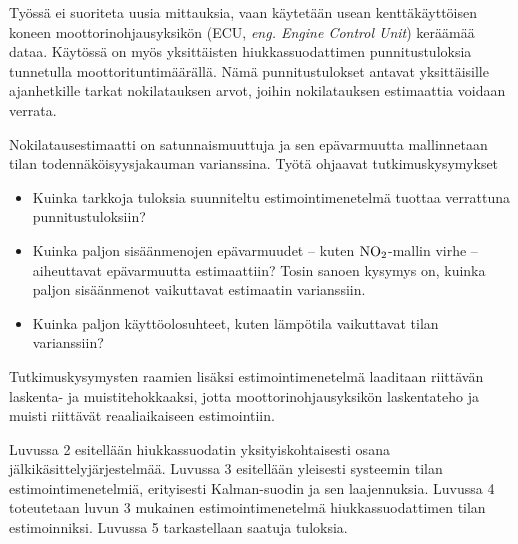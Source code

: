 Työssä ei suoriteta uusia mittauksia, vaan käytetään usean kenttäkäyttöisen koneen moottorinohjausyksikön (ECU, \emph{eng. Engine Control Unit}) keräämää dataa. Käytössä on myös yksittäisten hiukkassuodattimen punnitustuloksia tunnetulla moottorituntimäärällä. Nämä punnitustulokset antavat yksittäisille ajanhetkille tarkat nokilatauksen arvot, joihin nokilatauksen estimaattia voidaan verrata.

Nokilatausestimaatti on satunnaismuuttuja ja sen epävarmuutta mallinnetaan tilan todennäköisyysjakauman varianssina. Työtä ohjaavat tutkimuskysymykset
\begin{itemize}
    \item Kuinka tarkkoja tuloksia suunniteltu estimointimenetelmä tuottaa verrattuna punnitustuloksiin?
    \item Kuinka paljon sisäänmenojen epävarmuudet -- kuten \(\ce{NO}_2\)-mallin virhe -- aiheuttavat epävarmuutta estimaattiin? Tosin sanoen kysymys on, kuinka paljon sisäänmenot vaikuttavat estimaatin varianssiin.
    \item Kuinka paljon käyttöolosuhteet, kuten lämpötila vaikuttavat tilan varianssiin?
\end{itemize}
Tutkimuskysymysten raamien lisäksi estimointimenetelmä laaditaan riittävän laskenta- ja muistitehokkaaksi, jotta moottorinohjausyksikön laskentateho ja muisti riittävät reaaliaikaiseen estimointiin.


 

Luvussa 2 esitellään hiukkassuodatin yksityiskohtaisesti osana jälkikäsittelyjärjestelmää.
Luvussa 3 esitellään yleisesti systeemin tilan estimointimenetelmiä, erityisesti Kalman-suodin ja sen laajennuksia.
Luvussa 4 toteutetaan luvun 3 mukainen estimointimenetelmä hiukkassuodattimen tilan estimoinniksi. Luvussa 5 tarkastellaan saatuja tuloksia.